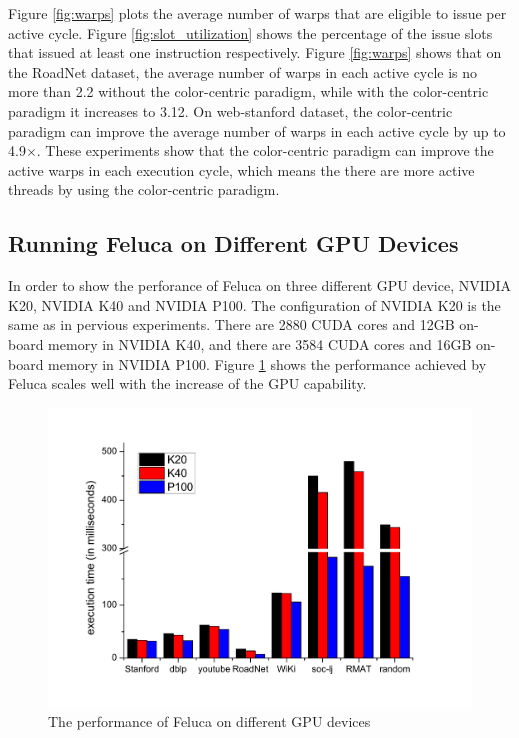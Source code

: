 Figure \ref{fig:warps} plots the average number of warps that are eligible to issue per active cycle. Figure \ref{fig:slot_utilization} shows the percentage of the issue slots that issued at least one instruction  respectively. Figure \ref{fig:warps} shows that on the RoadNet dataset, the average number of warps in each active cycle is no more than 2.2 without the color-centric paradigm, while with the color-centric paradigm it increases to 3.12. On web-stanford dataset, the color-centric paradigm can improve the average number of warps in each active cycle by up to 4.9$\times$. These experiments show that the color-centric paradigm can improve the active warps in each execution cycle, which means the there are more active threads by using the color-centric paradigm.



\subsection{Running Feluca on Different GPU Devices}
\label{subsec.scalability}
In order to show the perforance of Feluca on three different GPU device, NVIDIA K20, NVIDIA K40 and NVIDIA P100. The configuration of NVIDIA K20 is the same as in pervious experiments.  There are 2880 CUDA cores and 12GB on-board memory in NVIDIA K40, and there are 3584 CUDA cores and 16GB on-board memory in NVIDIA P100. Figure \ref{fig:scale} shows the performance achieved by Feluca scales well with the  increase of the GPU capability.

\begin{figure}[h]
	\centering
		\includegraphics[scale=0.25]{figure/scale.pdf}
	\caption{The performance of Feluca on different GPU devices}
	\label{fig:scale}%
\end{figure}
